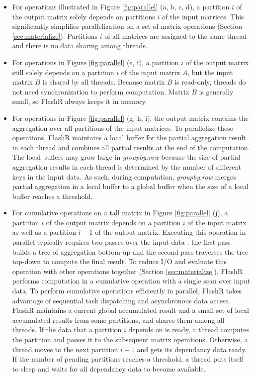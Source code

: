 \begin{itemize}
	\item For operations illustrated in Figure \ref{fig:parallel}
		(a, b, c, d), a partition $i$ of the output matrix
		solely depends on partitions $i$ of the input matrices. This
		significantly simplifies parallelization on a set of matrix operations
		(Section \ref{sec:materialize}). Partitions $i$ of all matrices
		are assigned to the same thread and there is no data sharing among
		threads.
	\item For operations in Figure \ref{fig:parallel} (e, f), a partition
		$i$ of the output matrix still solely depends on a partition
		$i$ of the input matrix $A$, but the input matrix
		$B$ is shared by all threads. Because matrix $B$ is
		read-only, threads do not need synchronization to perform computation.
		Matrix $B$ is generally small, so FlashR always keeps it in memory.
	\item For operations in Figure
		\ref{fig:parallel} (g, h, i), the output matrix contains the aggregation
		over all partitions of the input matrices. To parallelize these operations,
		FlashR maintains a local buffer for the partial aggregation result in each
		thread and combines all partial results at the end of
		the computation. The local buffers may grow large in
		\textit{groupby.row} because the size of partial aggregation
		results in each thread is determined by the number of different keys in
		the input data. As such, during computation, \textit{groupby.row} merges
		partial aggregation in a local buffer to a global buffer when the size of
		a local buffer reaches a threshold. 
	\item For cumulative operations on a tall matrix in Figure \ref{fig:parallel}
		(j), a partition $i$ of the output matrix depends on a partition $i$ of
		the input matrix as well as a partition $i-1$ of the output matrix.
		Executing this operation in parallel typically requires two passes over
		the input data \cite{Ladner1980}: the first pass builds a tree of
		aggregation bottom-up and the second pass traverses the tree top-down
		to compute the final result. To reduce I/O and evaluate this operation with
		other operations together (Section \ref{sec:materialize}), FlashR performs
		computation in a cumulative operation with a single scan over input
		data. To perform cumulative operations efficiently in parallel, FlashR
		takes advantage of sequential task dispatching and asynchronous data access.
		FlashR maintains
		a current global accumulated result and a small set of local accumulated
		results from some partitions, and shares them among all threads. If the data
		that a partition $i$ depends on is ready, a thread computes the partition
		and passes it to the subsequent matrix operations. Otherwise, a thread moves
		to the next partition $i+1$ and gets its dependancy data ready. If the number
		of pending partitions reaches a threshold, a thread puts itself to sleep
		and waits for all dependancy data to become available.
\end{itemize}

